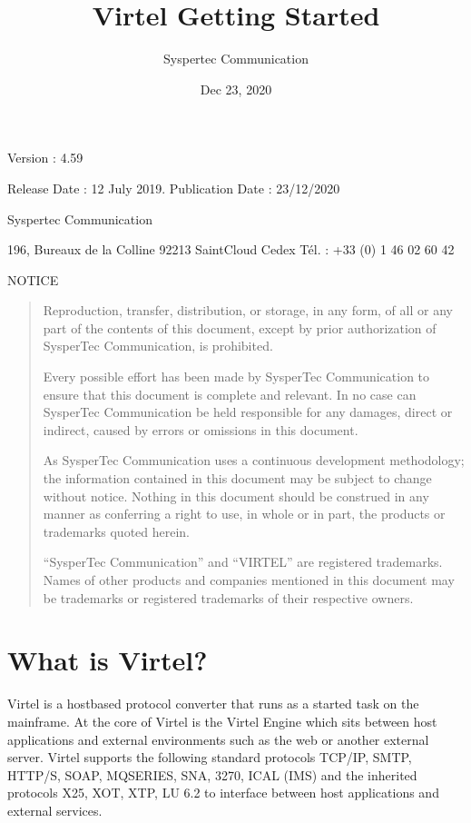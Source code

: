 \documentclass[letterpaper,10pt,english]{sphinxmanual}
\title{Virtel Getting Started}
\date{Dec 23, 2020}
\author{Syspertec Communication}
\begin{document}
\pagestyle{empty}
\sphinxmaketitle
\pagestyle{plain}
\sphinxtableofcontents
\pagestyle{normal}
\label{\detokenize{Getting_Started::doc}}



Version : 4.59

Release Date : 12 July 2019. Publication Date : 23/12/2020

Syspertec Communication

196, Bureaux de la Colline 92213 Saint\sphinxhyphen{}Cloud Cedex Tél. : +33 (0) 1 46 02 60 42


NOTICE
\begin{quote}

Reproduction, transfer, distribution, or storage, in any form, of all or any part of
the contents of this document, except by prior authorization of SysperTec
Communication, is prohibited.

Every possible effort has been made by SysperTec Communication to ensure that this document
is complete and relevant. In no case can SysperTec Communication be held responsible for
any damages, direct or indirect, caused by errors or omissions in this document.

As SysperTec Communication uses a continuous development methodology; the information
contained in this document may be subject to change without notice. Nothing in this
document should be construed in any manner as conferring a right to use, in whole or in
part, the products or trademarks quoted herein.

“SysperTec Communication” and “VIRTEL” are registered trademarks. Names of other products
and companies mentioned in this document may be trademarks or registered trademarks of
their respective owners.
\end{quote}


\chapter{What is Virtel?}
\label{\detokenize{Getting_Started:what-is-virtel}}
Virtel is a host\sphinxhyphen{}based protocol converter that runs as a started task on the mainframe. At the core of Virtel is the Virtel Engine which sits between host applications and external environments such as the web or another external server. Virtel supports the following standard protocols \sphinxhyphen{} TCP/IP, SMTP, HTTP/S, SOAP, MQ\sphinxhyphen{}SERIES, SNA, 3270, ICAL (IMS) and the inherited protocols \sphinxhyphen{} X25, XOT, XTP, LU 6.2 to interface between host applications and external services.
\end{document}
